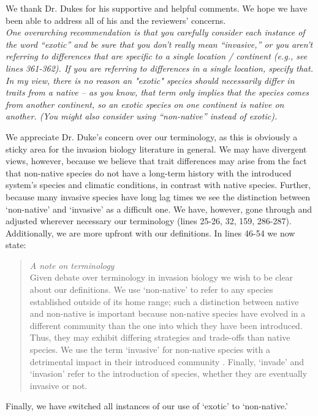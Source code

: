 \documentclass[11pt,a4paper]{letter}
\begin{document}
\begin{letter}{}
We thank Dr. Dukes for his supportive and helpful comments. We hope we have been able to address all of his and the reviewers' concerns.\\

\emph{One overarching recommendation is that you carefully consider each instance of the word ``exotic'' and be sure that you don't really mean ``invasive,'' or you aren't referring to differences that are specific to a single location / continent (e.g., see lines 361-362). If you are referring to differences in a single location, specify that. In my view, there is no reason an "exotic" species should necessarily differ in traits from a native -- as you know, that term only implies that the species comes from another continent, so an exotic species on one continent is native on another. (You might also consider using ``non-native'' instead of exotic).}

We appreciate Dr. Duke's concern over our terminology, as this is obviously a sticky area for the invasion biology literature in general. We may have divergent views, however, because we believe that trait differences may arise from the fact that non-native species do not have a long-term history with the introduced system's species and climatic conditions, in contrast with native species. Further, because many invasive species have long lag times we see the distinction between `non-native' and `invasive' as a difficult one. We have, however, gone through and adjusted wherever necessary our terminology (lines 25-26, 32, 159, 286-287). Additionally, we are more upfront with our definitions. In lines 46-54 we now state:
\begin{quote}
\noindent \emph{A note on terminology}\\
Given debate over terminology in invasion biology \citep{Colautti2009} we wish to be clear about our definitions. We use `non-native' to refer to any species established outside of its home range; such a distinction between native and non-native is important because non-native species have evolved in a different community than the one into which they have been introduced. Thus, they may exhibit differing strategies and trade-offs than native species.  We use the term `invasive' for non-native species with a detrimental impact in their introduced community \citep[following][]{Mack:2000bn}. Finally, `invade' and `invasion' refer to the introduction of species, whether they are eventually invasive or not.\\
\end{quote}
Finally, we have switched all instances of our use of `exotic' to `non-native.'\\


\end{letter}
\end{document}
